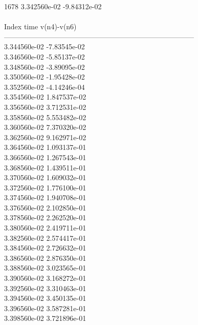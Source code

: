 1678	3.342560e-02	-9.84312e-02	\\ \hline
\\ \hline
Index   time            v(n4)-v(n6)     \\ \hline
--------------------------------------------------------------------------------\\ 	3.344560e-02	-7.83545e-02	\\ 	3.346560e-02	-5.85137e-02	\\ 	3.348560e-02	-3.89095e-02	\\ 	3.350560e-02	-1.95428e-02	\\ 	3.352560e-02	-4.14246e-04	\\ 	3.354560e-02	1.847537e-02	\\ 	3.356560e-02	3.712531e-02	\\ 	3.358560e-02	5.553482e-02	\\ 	3.360560e-02	7.370320e-02	\\ 	3.362560e-02	9.162971e-02	\\ 	3.364560e-02	1.093137e-01	\\ 	3.366560e-02	1.267543e-01	\\ 	3.368560e-02	1.439511e-01	\\ 	3.370560e-02	1.609032e-01	\\ 	3.372560e-02	1.776100e-01	\\ 	3.374560e-02	1.940708e-01	\\ 	3.376560e-02	2.102850e-01	\\ 	3.378560e-02	2.262520e-01	\\ 	3.380560e-02	2.419711e-01	\\ 	3.382560e-02	2.574417e-01	\\ 	3.384560e-02	2.726632e-01	\\ 	3.386560e-02	2.876350e-01	\\ 	3.388560e-02	3.023565e-01	\\ 	3.390560e-02	3.168272e-01	\\ 	3.392560e-02	3.310463e-01	\\ 	3.394560e-02	3.450135e-01	\\ 	3.396560e-02	3.587281e-01	\\ 	3.398560e-02	3.721896e-01	\\ \hline
